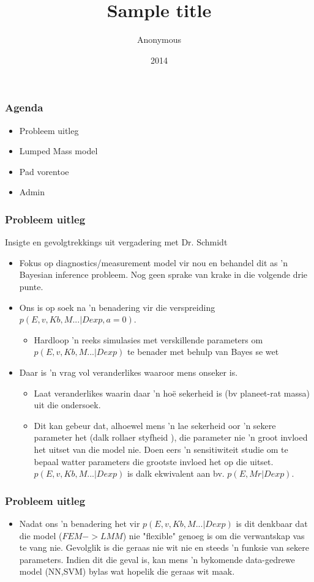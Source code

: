 \documentclass{beamer}
\title{Sample title}
\author{Anonymous}
\institute{Overleaf}
\date{2014}
\begin{document}
\begin{frame}
\frametitle{Agenda}
\begin{itemize}
	\item Probleem uitleg
	\item Lumped Mass model 
	\item Pad vorentoe
	\item Admin
\end{itemize}
\end{frame}

\begin{frame}
\frametitle{Probleem uitleg}
 Insigte en gevolgtrekkings uit vergadering met Dr. Schmidt
\begin{itemize}
	\item Fokus op diagnostics/measurement model vir nou en behandel dit as 'n Bayesian inference probleem. Nog geen sprake van krake in die volgende drie punte.
	\item Ons is op soek na 'n benadering vir die verspreiding $p(E,v,Kb,M...|Dexp,a = 0)$. 
		\begin{itemize}
			\item Hardloop 'n reeks simulasies met verskillende parameters om $p(E,v,Kb,M...|Dexp)$ te benader met behulp van Bayes se wet
		\end{itemize}
	\item Daar is 'n vrag vol veranderlikes waaroor mens onseker is. 
		\begin{itemize}
			\item Laat veranderlikes waarin daar 'n hoë sekerheid is (bv planeet-rat massa) uit die ondersoek.
			\item Dit kan gebeur dat, alhoewel mens 'n lae sekerheid oor 'n sekere parameter het (dalk rollaer styfheid ), die parameter nie 'n groot invloed het uitset van die model nie. Doen eers 'n sensitiwiteit studie om te bepaal watter parameters die grootste invloed het op die uitset. $p(E,v,Kb,M...|Dexp)$ is dalk ekwivalent aan bv. $p(E,Mr|Dexp)$.
		\end{itemize}
\end{itemize}

\end{frame}

\begin{frame}
\frametitle{Probleem uitleg}

\begin{itemize}

	\item Nadat ons 'n benadering het vir $p(E,v,Kb,M...|Dexp)$ is dit denkbaar dat die model ($FEM->LMM$) nie "flexible" genoeg is om die verwantskap vas te vang nie. Gevolglik is die geraas nie wit nie en steeds 'n funksie van sekere parameters. Indien dit die geval is, kan mens 'n bykomende data-gedrewe model (NN,SVM) bylas wat hopelik die geraas wit maak. 
\end{itemize}

\end{frame}
\end{document}
